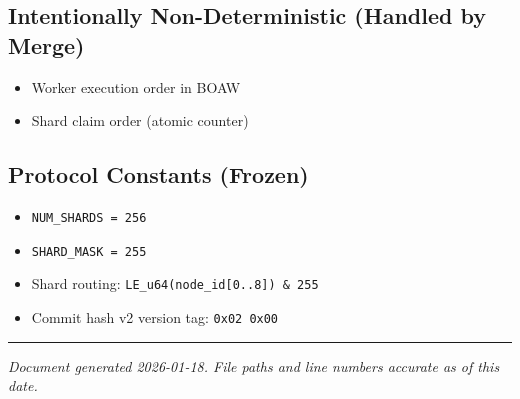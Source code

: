 \documentclass[
]{book}
\providecommand{\tightlist}{%
  \setlength{\itemsep}{0pt}\setlength{\parskip}{0pt}}
\begin{document}
\subsection{Intentionally Non-Deterministic (Handled by
Merge)}\label{intentionally-non-deterministic-handled-by-merge}

\begin{itemize}
\tightlist
\item
  Worker execution order in BOAW
\item
  Shard claim order (atomic counter)
\end{itemize}

\subsection{Protocol Constants
(Frozen)}\label{protocol-constants-frozen}

\begin{itemize}
\tightlist
\item
  \texttt{NUM\_SHARDS\ =\ 256}
\item
  \texttt{SHARD\_MASK\ =\ 255}
\item
  Shard routing: \texttt{LE\_u64(node\_id{[}0..8{]})\ \&\ 255}
\item
  Commit hash v2 version tag: \texttt{0x02\ 0x00}
\end{itemize}

\begin{center}\rule{0.5\linewidth}{0.5pt}\end{center}

\emph{Document generated 2026-01-18. File paths and line numbers
accurate as of this date.}

\backmatter
\end{document}
